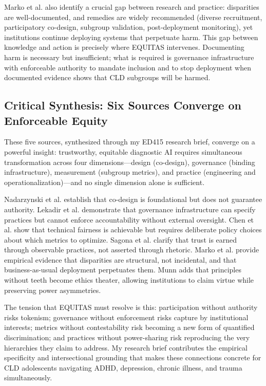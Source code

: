 \documentclass[12pt,letterpaper]{article}
\begin{document}
Marko et al. also identify a crucial gap between research and practice: disparities are well-documented, and remedies are widely recommended (diverse recruitment, participatory co-design, subgroup validation, post-deployment monitoring), yet institutions continue deploying systems that perpetuate harm.\cite{marko2025} This gap between knowledge and action is precisely where EQUITAS intervenes. Documenting harm is necessary but insufficient; what is required is governance infrastructure with enforceable authority to mandate inclusion and to stop deployment when documented evidence shows that CLD subgroups will be harmed.

\subsection{Critical Synthesis: Six Sources Converge on Enforceable Equity}

These five sources, synthesized through my ED415 research brief, converge on a powerful insight: trustworthy, equitable diagnostic AI requires simultaneous transformation across four dimensions---design (co-design), governance (binding infrastructure), measurement (subgroup metrics), and practice (engineering and operationalization)---and no single dimension alone is sufficient.\cite{garcia_ed415}

Nadarzynski et al. establish that co-design is foundational but does not guarantee authority.\cite{nadarzynski2024} Lekadir et al. demonstrate that governance infrastructure can specify practices but cannot enforce accountability without external oversight.\cite{lekadir2025} Chen et al. show that technical fairness is achievable but requires deliberate policy choices about which metrics to optimize.\cite{chen2023} Sagona et al. clarify that trust is earned through observable practices, not asserted through rhetoric.\cite{sagona2025} Marko et al. provide empirical evidence that disparities are structural, not incidental, and that business-as-usual deployment perpetuates them.\cite{marko2025} Munn adds that principles without teeth become ethics theater, allowing institutions to claim virtue while preserving power asymmetries.\cite{munn_idai700}

The tension that EQUITAS must resolve is this: participation without authority risks tokenism; governance without enforcement risks capture by institutional interests; metrics without contestability risk becoming a new form of quantified discrimination; and practices without power-sharing risk reproducing the very hierarchies they claim to address.\cite{munn_idai700} My research brief contributes the empirical specificity and intersectional grounding that makes these connections concrete for CLD adolescents navigating ADHD, depression, chronic illness, and trauma simultaneously.\cite{garcia_ed415}
\end{document}
